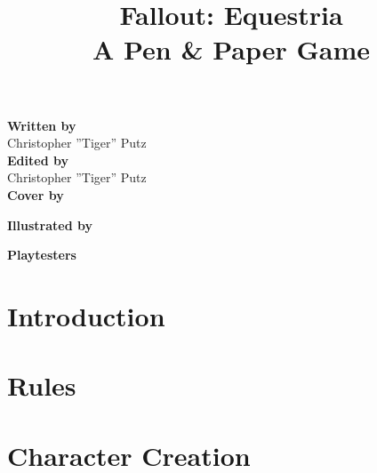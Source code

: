 \documentclass[12pt]{book}
\title{Fallout: Equestria\\
		\large A Pen \& Paper Game}
\begin{document}
\maketitle

\begin{center}
\textbf{\large Written by} \\ \normalsize
Christopher ''Tiger'' Putz \\

\vspace{14pt} \textbf{\large Edited by} \\ \normalsize
Christopher ''Tiger'' Putz \\

\vspace{14pt} \textbf{\large Cover by} \\ \normalsize

\vspace{14pt} \textbf{\large Illustrated by} \\ \normalsize

\vspace{14pt} \textbf{\large Playtesters} \\ \normalsize
 
\end{center}

\tableofcontents
  
\chapter{Introduction}
\begin{multicols*}{2}

\end{multicols*}

\chapter{Rules}
\begin{multicols*}{2}

\end{multicols*}

\chapter{Character Creation}
\begin{multicols*}{2}

\end{multicols*}
\end{document}
